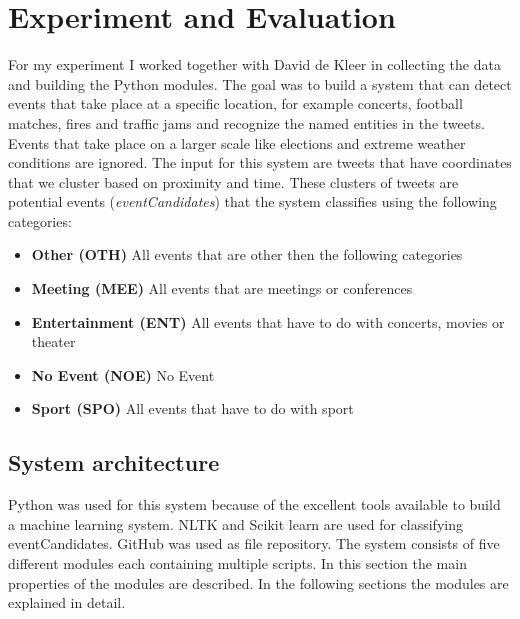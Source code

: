 \documentclass[
10pt, %
a4paper, %
oneside, %
headinclude,footinclude, %
BCOR5mm, %
]{scrartcl}
\begin{document}
\section{Experiment and Evaluation}
For my experiment I worked together with David de Kleer in collecting the data and building the Python modules. The goal was to build a system that can detect events that take place at a specific location, for example concerts, football matches, fires and traffic jams and recognize the named entities in the tweets.  Events that take place on a larger scale like elections and extreme weather conditions are ignored. The input for this system are tweets that have coordinates that we cluster based on proximity and time. These clusters of tweets are potential events (\textit{eventCandidates}) that the system classifies using the following categories: \newline

\begin{itemize}[noitemsep] %
\item \textbf{Other (OTH)} All events that are other then the following categories 
\item \textbf{Meeting (MEE)} All events that are meetings or conferences 
\item \textbf{Entertainment (ENT)} All events that have to do with concerts, movies or theater
\item \textbf{No Event (NOE)} No Event
\item \textbf{Sport (SPO)} All events that have to do with sport 
\end{itemize}



\subsection{System architecture}
Python was used for this system because of the excellent tools available to build a machine learning system. NLTK and Scikit learn are used for classifying eventCandidates. GitHub was used as file repository. The system consists of five different modules each containing multiple scripts. In this section the main properties of the modules are described. In the following sections the modules are explained in detail.
\end{document}
